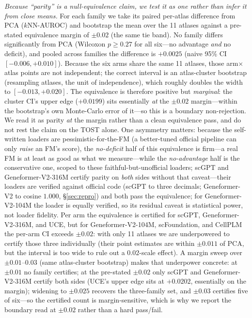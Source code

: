 \documentclass[fleqn,10pt,lineno]{wlpeerj}  %
\begin{document}
\emph{Because ``parity'' is a null-equivalence claim, we test it as one rather than infer it from close means.} For each family we take its paired per-atlas difference from PCA ($k$NN-AUROC) and bootstrap the mean over the 11 atlases against a pre-stated equivalence margin of $\pm0.02$ (the same tie band). No family differs significantly from PCA (Wilcoxon $p\ge0.27$ for all six---no advantage \emph{and} no deficit), and pooled across families the difference is $+0.0025$ (naive 95\% CI $[-0.006,+0.010]$). Because the six arms share the same 11 atlases, those arm$\times$atlas points are not independent; the correct interval is an atlas-cluster bootstrap (resampling atlases, the unit of independence), which roughly doubles the width to $[-0.013,+0.020]$. The equivalence is therefore positive but \emph{marginal}: the cluster CI's upper edge ($+0.0199$) sits essentially \emph{at} the $\pm0.02$ margin---within the bootstrap's own Monte-Carlo error of it---so this is a boundary non-rejection. We read it as parity \emph{at} the margin rather than a clean equivalence pass, and do not rest the claim on the TOST alone. One asymmetry matters: because the self-written loaders are pessimistic-for-the-FM (a better-tuned official pipeline can only \emph{raise} an FM's score), the \emph{no-deficit} half of this equivalence is firm---a real FM is at least as good as what we measure---while the \emph{no-advantage} half is the conservative one, scoped to these faithful-but-unofficial loaders; scGPT and Geneformer-V2-316M certify parity on \emph{both} sides without that caveat---their loaders are verified against official code (scGPT to three decimals; Geneformer-V2 to cosine $1.000$, \S\ref{sec:repro}) and both pass the equivalence; for Geneformer-V2-104M the loader is equally verified, so its residual caveat is statistical power, not loader fidelity. Per arm the equivalence is certified for scGPT, Geneformer-V2-316M, and UCE, but for Geneformer-V2-104M, scFoundation, and CellPLM the per-arm CI exceeds $\pm0.02$: with only 11 atlases we are underpowered to certify those three individually (their point estimates are within $\pm0.011$ of PCA, but the interval is too wide to rule out a $0.02$-scale effect). A margin sweep over $\pm0.01$--$0.03$ (same atlas-cluster bootstrap) makes that underpower concrete: at $\pm0.01$ no family certifies; at the pre-stated $\pm0.02$ only scGPT and Geneformer-V2-316M certify both sides (UCE's upper edge sits at $+0.0202$, essentially on the margin); widening to $\pm0.025$ recovers the three-family set, and $\pm0.03$ certifies five of six---so the certified count is margin-sensitive, which is why we report the boundary read at $\pm0.02$ rather than a hard pass/fail.
\end{document}
